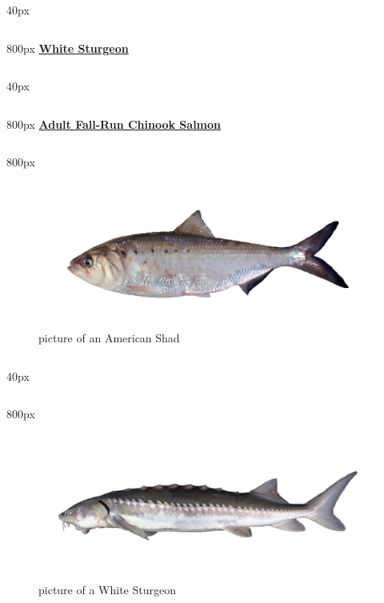 \documentclass[
]{book}
\begin{document}
\begin{column}{40px\textwidth}
~
\end{column}

\begin{column}{800px\textwidth}
\textbf{\href{http://calfish.ucdavis.edu/species/?uid=182\&ds=698}{White Sturgeon}}
\end{column}

\begin{column}{40px\textwidth}
~
\end{column}

\begin{column}{800px\textwidth}
\textbf{\href{http://calfish.ucdavis.edu/species/?uid=26\&ds=698}{Adult Fall-Run Chinook Salmon}}
\end{column}

\begin{column}{800px\textwidth}
\begin{figure}

{\centering \includegraphics[width=29.17in]{figures/american_shad} 

}

\caption{picture of an American Shad}\label{fig:unnamed-chunk-127}
\end{figure}
\end{column}

\begin{column}{40px\textwidth}
~
\end{column}

\begin{column}{800px\textwidth}
\begin{figure}

{\centering \includegraphics[width=29.17in]{figures/white_sturgeon_adult} 

}

\caption{picture of a White Sturgeon}\label{fig:unnamed-chunk-128}
\end{figure}
\end{column}
\end{document}
